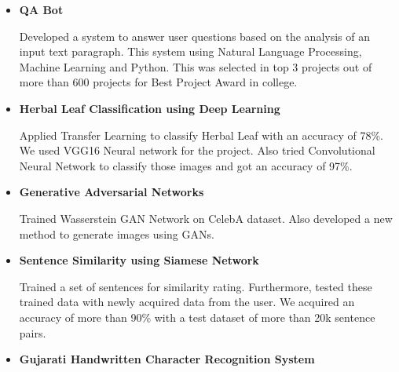 \documentclass[11pt,a4paper,sans]{moderncv}        %
\begin{document}
\vspace{5pt}



\begin{itemize}

\item{\textbf{QA Bot}

\vspace{3pt}

\small{Developed a system to answer user questions based on the analysis of an input text paragraph. This system using Natural Language Processing, Machine Learning and Python. This was selected in top 3 projects out of more than 600 projects for Best Project Award in college.}}
\vspace{5pt}

\item{\textbf{Herbal Leaf Classification using Deep Learning} 

\vspace{3pt}

\small{Applied Transfer Learning to classify Herbal Leaf with an accuracy of 78\%. We used VGG16 Neural network for the project. Also tried Convolutional Neural Network to classify those images and got an accuracy of 97\%.}}

\vspace{5pt}

\item{\textbf{Generative Adversarial Networks} 

\vspace{3pt}

\small{Trained Wasserstein GAN Network on CelebA dataset. Also developed a new method to generate images using GANs.}}

\vspace{5pt}
\newpage
\item{\textbf{Sentence Similarity using Siamese Network} 

\vspace{3pt}

\small{Trained a set of sentences for similarity rating. Furthermore, tested these trained data with newly acquired data from the user. We acquired an accuracy of more than 90\% with a test dataset of more than 20k sentence pairs.}}

\vspace{5pt}

\item{\textbf{Gujarati Handwritten Character Recognition System} 

\vspace{3pt}

}
\end{itemize}
\end{document}
